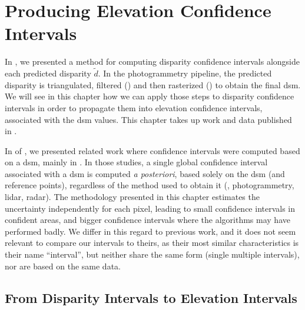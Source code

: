 \chapter{Producing Elevation Confidence Intervals}\label{chap:elevation_intervals}
In , we presented a method for computing disparity confidence intervals alongside each predicted disparity $\tilde{d}$. In the photogrammetry pipeline, the predicted disparity is triangulated, filtered () and then rasterized () to obtain the final \acrshort{dsm}. We will see in this chapter how we can apply those steps to disparity confidence intervals in order to propagate them into elevation confidence intervals, associated with the \acrshort{dsm} values. This chapter takes up work and data published in \cite{malinowski_robust_2024}.

In  of , we presented related work where confidence intervals were computed based on a \acrshort{dsm}, mainly in \cite{oksanen_digital_2006,panagiotakis_validation_2018,deschamps-berger_apport_2021}. In those studies, a single global confidence interval associated with a \acrshort{dsm} is computed \textit{a posteriori}, \ie based solely on the \acrshort{dsm} (and reference points), regardless of the method used to obtain it (\ie, photogrammetry, \acrshort{lidar}, \acrshort{radar}). The methodology presented in this chapter estimates the uncertainty independently for each pixel, leading to small confidence intervals in confident areas, and bigger confidence intervals where the algorithms may have performed badly. We differ in this regard to previous work, and it does not seem relevant to compare our intervals to theirs, as their most similar characteristics is their name ``interval'', but neither share the same form (single \vs multiple intervals), nor are based on the same data.

\section{From Disparity Intervals to Elevation Intervals}\label{sec:elevation_intervals}
